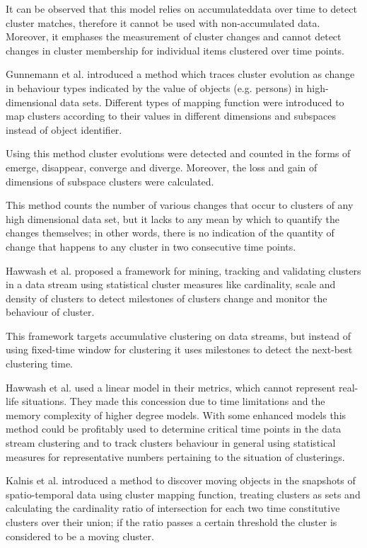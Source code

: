 It can be observed that this model relies on \gls{accumulateddata} over time to detect cluster matches, therefore it cannot be used with non-accumulated data. Moreover, it emphases the measurement of cluster changes and cannot detect changes in cluster membership for individual items clustered over time points.



Gunnemann et al. \cite{Gunnemann2011a} introduced a method which traces cluster evolution as change in behaviour types indicated by the value of objects (e.g. persons) in high-dimensional data sets. Different types of mapping function were introduced to map clusters according to their values in different dimensions and subspaces instead of object identifier.

Using this method cluster evolutions were detected and counted in the forms of emerge, disappear, converge and diverge. Moreover, the loss and gain of dimensions of subspace clusters were calculated.

This method counts the number of various changes that occur to clusters of any high dimensional data set, but it lacks to any mean by which to quantify the changes themselves; in other words, there is no indication of the quantity of change that happens to any cluster in two consecutive time points.



Hawwash et al. \cite{Hawwash2012a} proposed a framework for mining, tracking and validating clusters in a data stream using statistical cluster measures like cardinality, scale and density of clusters to detect milestones of clusters change and monitor the behaviour of cluster.

This framework targets accumulative clustering on data streams, but instead of using fixed-time window for clustering it uses milestones to detect the next-best clustering time.

Hawwash et al. \cite{Hawwash2012a} used a linear model in their metrics, which cannot represent real-life situations. They made this concession due to time limitations and the memory complexity of higher degree models. With some enhanced models this method could be profitably used to determine critical time points in the data stream clustering and to track clusters behaviour in general using statistical measures for representative numbers pertaining to the situation of clusterings.



Kalnis et al. \cite{Kalnis2005} introduced a method to discover moving objects in the snapshots of spatio-temporal data using cluster mapping function, treating clusters as sets and calculating the cardinality ratio of intersection for each two time constitutive clusters over their union; if the ratio passes a certain threshold the cluster is considered to be a moving cluster.

